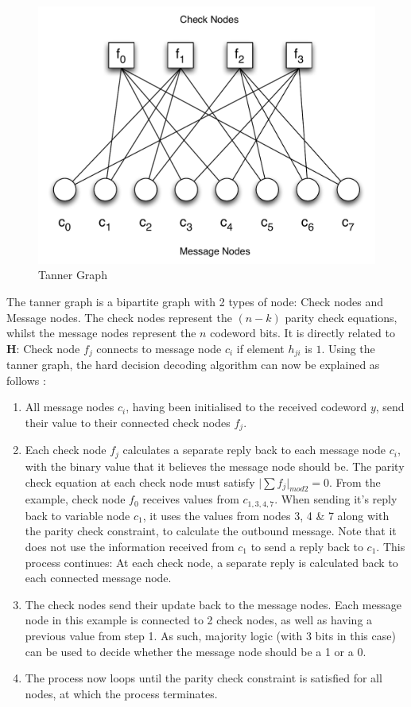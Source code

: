 \documentclass[11pt]{article}
\numberwithin{equation}{subsection}
\begin{document}
\begin{figure}[h]
\centering
\includegraphics[scale=0.6]{tannergraph}
\caption{Tanner Graph}
\label{figure:tanner graph}
\end{figure}

The tanner graph is a bipartite graph with 2 types of node: Check nodes and Message nodes. The check nodes represent the $(n-k)$ parity check equations, whilst the message nodes represent the $n$ codeword bits. It is directly related to $\mathbf{H}$: Check node $f_j$ connects to message node $c_i$ if element $h_{ji}$ is $1$. Using the tanner graph, the hard decision decoding algorithm can now be explained as follows \cite{ldpc-tutorial1}:
\begin{enumerate}
\item All message nodes $c_i$, having been initialised to the received codeword $y$, send their value to their connected check nodes $f_j$.
\item Each check node $f_j$ calculates a separate reply back to each message node $c_i$, with the binary value that it believes the message node should be. The parity check equation at each check node must satisfy $\lvert \sum f_j \rvert_{mod2} = 0$. From the example, check node $f_0$ receives values from $c_{1,3,4,7}$. When sending it's reply back to variable node $c_1$, it uses the values from nodes 3, 4 \& 7 along with the parity check constraint, to calculate the outbound message. Note that it does not use the information received from $c_1$ to send a reply back to $c_1$. This process continues: At each check node, a separate reply is calculated back to each connected message node.
\item The check nodes send their update back to the message nodes. Each message node in this example is connected to 2 check nodes, as well as having a previous value from step 1. As such, majority logic (with 3 bits in this case) can be used to decide whether the message node should be a 1 or a 0. 
\item The process now loops until the parity check constraint is satisfied for all nodes, at which the process terminates.
\end{enumerate}
\end{document}
